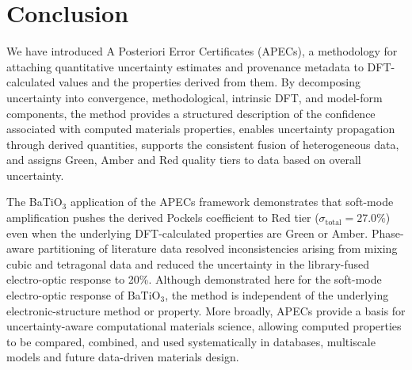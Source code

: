\documentclass[prb,twocolumn,superscriptaddress,amsmath,amssymb,longbibliography]{revtex4-2}
\begin{document}
\section{Conclusion}
\label{sec:conclusion}

We have introduced A Posteriori Error Certificates (APECs), a methodology for attaching quantitative uncertainty estimates and provenance metadata to DFT-calculated values and the properties derived from them.  By decomposing  uncertainty into convergence, methodological, intrinsic DFT, 
and model-form components, the method provides a structured description of the confidence associated with computed materials properties, enables uncertainty propagation through derived quantities, supports the consistent fusion of heterogeneous data, and assigns Green, Amber and Red quality tiers to data based on overall uncertainty. 

The BaTiO$_3$ application of the APECs framework   demonstrates that 
soft-mode amplification pushes the derived Pockels coefficient to Red 
tier ($\sigma_{\mathrm{total}} = 27.0\%$) even when the underlying DFT-calculated 
properties are Green or Amber. Phase-aware partitioning of literature 
data resolved inconsistencies arising from mixing cubic and tetragonal data and reduced the uncertainty in the library-fused electro-optic response to 20\%. Although demonstrated here for the soft-mode electro-optic response of BaTiO$_3$, the method is independent of the underlying electronic-structure method or property. More broadly, APECs provide a  basis for uncertainty-aware computational materials science, allowing computed properties to be compared, combined, and used systematically in databases, multiscale models and future data-driven materials design.


\end{document}
